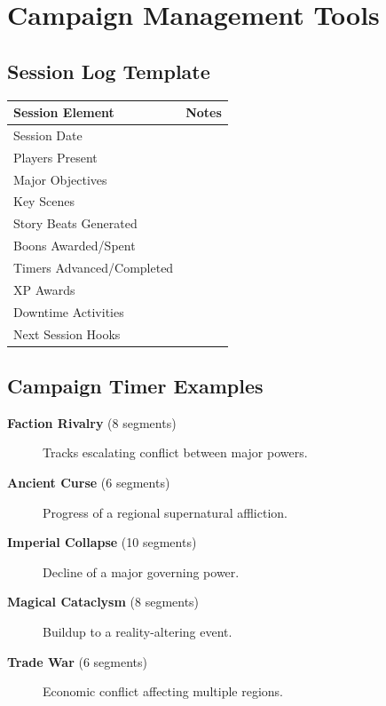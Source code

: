 \newpage
\section{Campaign Management Tools}\label{sec:campaign_tools}

\subsection{Session Log Template}\label{subsec:session_log_template}
\begin{center}
\feTableStart
\begin{tabularx}{\linewidth}{@{}p{4cm} Y@{}}
\toprule
\textbf{Session Element} & \textbf{Notes} \\
\midrule
Session Date & \\
Players Present & \\
Major Objectives & \\
Key Scenes & \\
Story Beats Generated & \\
Boons Awarded/Spent & \\
Timers Advanced/Completed & \\
XP Awards & \\
Downtime Activities & \\
Next Session Hooks & \\
\bottomrule
\end{tabularx}
\feTableEnd
\end{center}

\subsection{Campaign Timer Examples}\label{subsec:campaign_timers}
\begin{description}
    \item[\textbf{Faction Rivalry} (8 segments)] Tracks escalating conflict between major powers.
    \item[\textbf{Ancient Curse} (6 segments)] Progress of a regional supernatural affliction.
    \item[\textbf{Imperial Collapse} (10 segments)] Decline of a major governing power.
    \item[\textbf{Magical Cataclysm} (8 segments)] Buildup to a reality-altering event.
    \item[\textbf{Trade War} (6 segments)] Economic conflict affecting multiple regions.
\end{description}

